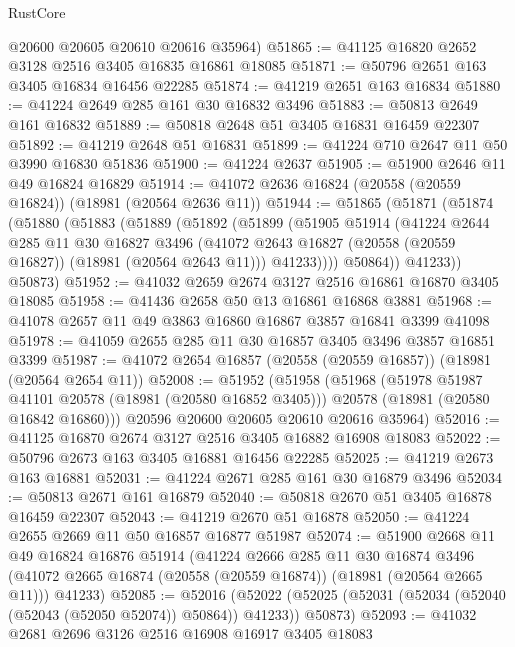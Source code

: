 \begin{lexlean}{RustCore}
\begin{coremodule}
      @20600
      @20605
      @20610
      @20616
      @35964)
@51865 := @41125 @16820 @2652 @3128 @2516 @3405 @16835 @16861 @18085
@51871 := @50796 @2651 @163 @3405 @16834 @16456 @22285
@51874 := @41219 @2651 @163 @16834
@51880 := @41224 @2649 @285 @161 @30 @16832 @3496
@51883 := @50813 @2649 @161 @16832
@51889 := @50818 @2648 @51 @3405 @16831 @16459 @22307
@51892 := @41219 @2648 @51 @16831
@51899 := @41224 @710 @2647 @11 @50 @3990 @16830 @51836
@51900 := @41224 @2637
@51905 := @51900 @2646 @11 @49 @16824 @16829
@51914 := @41072 @2636 @16824 (@20558 (@20559 @16824)) (@18981 (@20564 @2636 @11))
@51944 := @51865
    (@51871
      (@51874
        (@51880
          (@51883
            (@51889
              (@51892
                (@51899
                  (@51905
                    @51914
                    (@41224
                      @2644
                      @285
                      @11
                      @30
                      @16827
                      @3496
                      (@41072 @2643 @16827 (@20558 (@20559 @16827)) (@18981 (@20564 @2643 @11)))
                      @41233))))
              @50864))
          @41233))
      @50873)
@51952 := @41032 @2659 @2674 @3127 @2516 @16861 @16870 @3405 @18085
@51958 := @41436 @2658 @50 @13 @16861 @16868 @3881
@51968 := @41078 @2657 @11 @49 @3863 @16860 @16867 @3857 @16841 @3399 @41098
@51978 := @41059 @2655 @285 @11 @30 @16857 @3405 @3496 @3857 @16851 @3399
@51987 := @41072 @2654 @16857 (@20558 (@20559 @16857)) (@18981 (@20564 @2654 @11))
@52008 := @51952
    (@51958
      (@51968
        (@51978 @51987 @41101 @20578 (@18981 (@20580 @16852 @3405)))
        @20578
        (@18981 (@20580 @16842 @16860)))
      @20596
      @20600
      @20605
      @20610
      @20616
      @35964)
@52016 := @41125 @16870 @2674 @3127 @2516 @3405 @16882 @16908 @18083
@52022 := @50796 @2673 @163 @3405 @16881 @16456 @22285
@52025 := @41219 @2673 @163 @16881
@52031 := @41224 @2671 @285 @161 @30 @16879 @3496
@52034 := @50813 @2671 @161 @16879
@52040 := @50818 @2670 @51 @3405 @16878 @16459 @22307
@52043 := @41219 @2670 @51 @16878
@52050 := @41224 @2655 @2669 @11 @50 @16857 @16877 @51987
@52074 := @51900
    @2668
    @11
    @49
    @16824
    @16876
    @51914
    (@41224
      @2666
      @285
      @11
      @30
      @16874
      @3496
      (@41072 @2665 @16874 (@20558 (@20559 @16874)) (@18981 (@20564 @2665 @11)))
      @41233)
@52085 := @52016
    (@52022 (@52025 (@52031 (@52034 (@52040 (@52043 (@52050 @52074)) @50864)) @41233)) @50873)
@52093 := @41032 @2681 @2696 @3126 @2516 @16908 @16917 @3405 @18083

\end{coremodule}
\end{lexlean}
